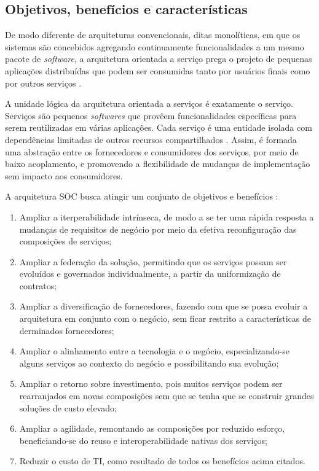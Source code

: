 \subsection{Objetivos, benefícios e características}
\vspace{-6mm}

De modo diferente de arquiteturas convencionais, ditas monolíticas, em que os
sistemas são concebidos agregando continuamente funcionalidades a um mesmo pacote de
\textit{software}, a arquitetura orientada a serviço prega o projeto de pequenas
aplicações distribuídas que podem ser consumidas tanto por usuários finais como
por outros serviços \cite{papazoglou2007serviceApprTechRechIss}. 

A unidade lógica da arquitetura orientada a serviços é exatamente o serviço.
Serviços são pequenos \textit{softwares} que provêem funcionalidades específicas
para serem reutilizadas em várias aplicações. Cada serviço é uma entidade isolada com
dependências limitadas de outros recursos compartilhados
\cite{serrano2014service}. Assim, é formada uma abstração entre os fornecedores
e consumidores dos serviços, por meio de baixo acoplamento, e promovendo a
flexibilidade de mudanças de implementação sem impacto aos consumidores.

A arquitetura SOC busca atingir um conjunto de objetivos e benefícios
\cite{erl2008soaDesigPatterns}:
\begin{enumerate}[label=(\alph*)] 
  \item Ampliar a iterperabilidade intrínseca, de modo a se ter uma rápida
  resposta a mudanças de requisitos de negócio por meio da efetiva
  reconfiguração das composições de serviços;
  \item Ampliar a federação da solução, permitindo que os serviços possam ser
  evoluídos e governados individualmente, a partir da uniformização de
  contratos;
  \item Ampliar a diversificação de fornecedores, fazendo com que se possa
  evoluir a arquitetura em conjunto com o negócio, sem ficar restrito a
  características de derminados fornecedores;
  \item Ampliar o alinhamento entre a tecnologia e o negócio, especializando-se
  alguns serviços ao contexto do negócio e possibilitando sua evolução;
  \item Ampliar o retorno sobre investimento, pois muitos serviços podem
  ser rearranjados em novas composições sem que se tenha que se construir
  grandes soluções de custo elevado;
  \item Ampliar a agilidade, remontando as composições por reduzido esforço,
  beneficiando-se do reuso e interoperabilidade nativas dos serviços;
  \item Reduzir o custo de TI, como resultado de todos os benefícios acima
  citados.
\end{enumerate}

